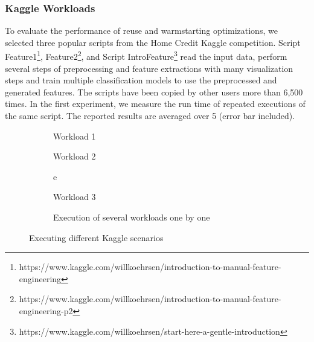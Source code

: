 \subsubsection{Kaggle Workloads}
To evaluate the performance of reuse and warmstarting optimizations, we selected three popular scripts from the Home Credit Kaggle competition.
Script Feature1\footnote{https://www.kaggle.com/willkoehrsen/introduction-to-manual-feature-engineering}, Feature2\footnote{https://www.kaggle.com/willkoehrsen/introduction-to-manual-feature-engineering-p2}, and Script IntroFeature\footnote{https://www.kaggle.com/willkoehrsen/start-here-a-gentle-introduction} read the input data, perform several steps of preprocessing and feature extractions with many visualization steps and train multiple classification models to use the preprocessed and generated features.
The scripts have been copied by other users more than 6,500 times.
In the first experiment, we measure the run time of repeated executions of the same script.
The reported results are averaged over 5 (error bar included).
\begin{figure}
\begin{subfigure}[b]{0.33\linewidth}
\centering
 \resizebox{\columnwidth}{!}{%
%
}

\caption{Workload 1}
\end{subfigure}%
\begin{subfigure}[b]{0.33\linewidth}
\centering
 \resizebox{\columnwidth}{!}{%
%
}

\caption{Workload 2}
\end{subfigure}%
\begin{subfigure}[b]{0.33\linewidth}
\centering
 \resizebox{\columnwidth}{!}{%
%
}e
\caption{Workload 3}
\end{subfigure}
\begin{subfigure}[b]{\linewidth}
\centering
 \resizebox{\columnwidth}{!}{%
%
}
\caption{Execution of several workloads one by one}
\end{subfigure}
\caption{Executing different Kaggle scenarios}
\label{exp-reuse-kaggle-same-workload}
\end{figure}

